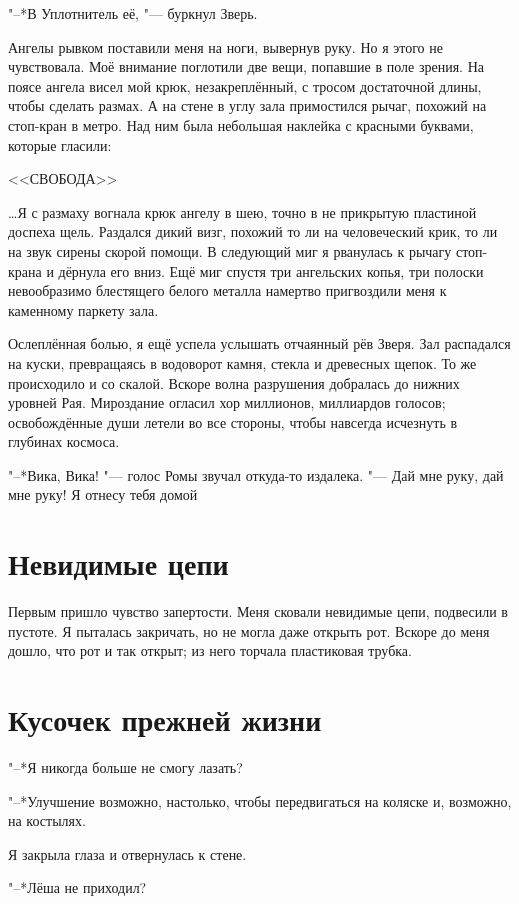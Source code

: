 "--*В Уплотнитель её, "--- буркнул Зверь.

Ангелы рывком поставили меня на ноги, вывернув руку.
Но я этого не чувствовала.
Моё внимание поглотили две вещи, попавшие в поле зрения.
На поясе ангела висел мой крюк, незакреплённый, с тросом достаточной длины, чтобы сделать размах.
А на стене в углу зала примостился рычаг, похожий на стоп-кран в метро.
Над ним была небольшая наклейка с красными буквами, которые гласили:

<<СВОБОДА>>

\dots Я с размаху вогнала крюк ангелу в шею, точно в не прикрытую пластиной доспеха щель.
Раздался дикий визг, похожий то ли на человеческий крик, то ли на звук сирены скорой помощи.
В следующий миг я рванулась к рычагу стоп-крана и дёрнула его вниз.
Ещё миг спустя три ангельских копья, три полоски невообразимо блестящего белого металла намертво пригвоздили меня к каменному паркету зала.

Ослеплённая болью, я ещё успела услышать отчаянный рёв Зверя.
Зал распадался на куски, превращаясь в водоворот камня, стекла и древесных щепок.
То же происходило и со скалой.
Вскоре волна разрушения добралась до нижних уровней Рая.
Мироздание огласил хор миллионов, миллиардов голосов;
освобождённые души летели во все стороны, чтобы навсегда исчезнуть в глубинах космоса.

"--*Вика, Вика! "--- голос Ромы звучал откуда-то издалека.
"--- Дай мне руку, дай мне руку! 
Я отнесу тебя домой\ldotst

\section{Невидимые цепи}

Первым пришло чувство запертости.
Меня сковали невидимые цепи, подвесили в пустоте.
Я пыталась закричать, но не могла даже открыть рот.
Вскоре до меня дошло, что рот и так открыт;
из него торчала пластиковая трубка.

\section{Кусочек прежней жизни}

"--*Я никогда больше не смогу лазать?

"--*Улучшение возможно, настолько, чтобы передвигаться на коляске и, возможно, на костылях.

Я закрыла глаза и отвернулась к стене.

"--*Лёша не приходил?

